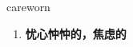 
\begin{frame}
{\huge careworn}
\begin{center}
\begin{enumerate}\Large
  \item \textbf{忧心忡忡的，焦虑的}
\end{enumerate}
\end{center}
\end{frame}
